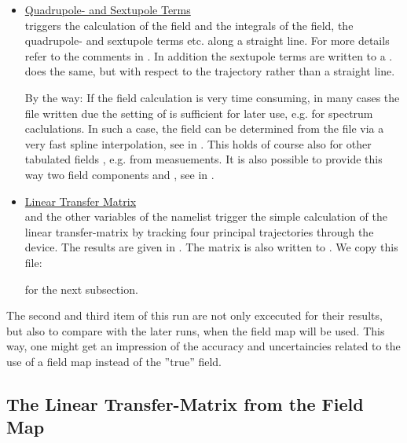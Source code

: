\begin{itemize}
Note the dip in the middle, which is a consequence of the slit between
the magnet rows, espacially for  (blue line). This means that the transveral
field gradients of the device depend on the transversal position of the beam electrons, thus
complicating tracking calculations.

\item \underline{Quadrupole- and Sextupole Terms} \\

 triggers the calculation of the field and the integrals of
the field, the quadrupole- and
sextupole terms etc. along a straight line. For more details refer to the
comments in \wie. In addition the sextupole terms are
written to a \bsp.  does the same, but with respect to the trajectory rather
than a straight line.

By the way: If the field calculation is very
time consuming, in many cases the file written due the
setting of  is sufficient for later use, e.g. for spectrum
caclulations. In such a case, the field can be determined from the
file via a very fast spline interpolation, see  in \wi. This
holds of course also for other tabulated fields , e.g. from
measuements. It is also  possible to provide this way two field
components  and , see  in \wi.

\item \underline{Linear Transfer Matrix} \\

 and the other variables of the namelist
 trigger the simple calculation of the linear
transfer-matrix by tracking four principal trajectories through the
device. The results are given in \woe\bsp. The matrix is also written to
\bsp. We copy this file:


for the next subsection.

\end{itemize}

The second and third item of this run are not only excecuted for their
results, but also to compare with the later runs, when the field map
will be used. This way, one might get an impression of the accuracy and
uncertaincies related to the use of a field map instead of the
''true'' field.

\subsection{The Linear Transfer-Matrix from the Field Map} \label{ex12b}

